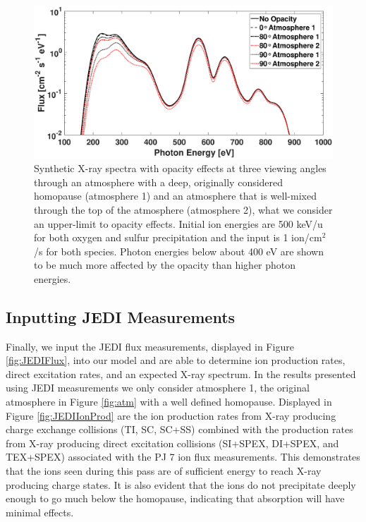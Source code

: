 \documentclass[draft]{agujournal2018}
\begin{document}
\begin{figure}
    \centering
    \includegraphics[width=\textwidth]{Figures/OpacityATM1ATM2.eps}
    \caption{Synthetic X-ray spectra with opacity effects at three viewing angles through an atmosphere with a deep, originally considered homopause (atmosphere 1) and an atmosphere that is well-mixed through the top of the atmosphere (atmosphere 2), what we consider an upper-limit to opacity effects. Initial ion energies are 500 keV/u for both oxygen and sulfur precipitation and the input is 1 ion/cm$^2$/s for both species. Photon energies below about 400 eV are shown to be much more affected by the opacity than higher photon energies.}
    \label{fig:XraySpecOpac}
\end{figure}

\subsection{Inputting JEDI Measurements}
\label{sec:JEDIMeasurements}

Finally, we input the JEDI flux measurements, displayed in Figure \ref{fig:JEDIFlux}, into our model and are able to determine ion production rates, direct excitation rates, and an expected X-ray spectrum.
In the results presented using JEDI measurements we only consider atmosphere 1, the original atmosphere in Figure \ref{fig:atm} with a well defined homopause.
Displayed in Figure \ref{fig:JEDIIonProd} are the ion production rates from X-ray producing charge exchange collisions (TI, SC, SC+SS) combined with the production rates from X-ray producing direct excitation collisions (SI+SPEX, DI+SPEX, and TEX+SPEX) associated with the PJ 7 ion flux measurements.
This demonstrates that the ions seen during this pass are of sufficient energy to reach X-ray producing charge states.
It is also evident that the ions do not precipitate deeply enough to go much below the homopause, indicating that absorption will have minimal effects.
\end{document}
